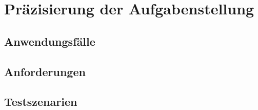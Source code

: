 \chapter{Pr\"azisierung der Aufgabenstellung}

\section{Anwendungsf\"alle}


\section{Anforderungen}


\section{Testszenarien}



